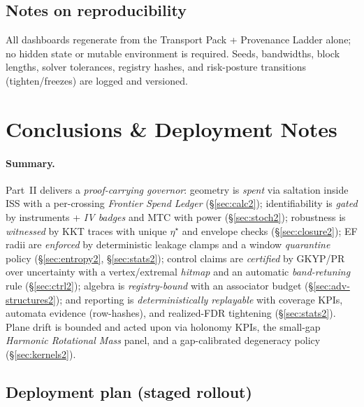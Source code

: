 \documentclass[10pt]{article}
\begin{document}
\subsection*{Notes on reproducibility}
All dashboards regenerate from the Transport Pack + Provenance Ladder alone; no hidden state or mutable environment is required. Seeds, bandwidths, block lengths, solver tolerances, registry hashes, and risk-posture transitions (tighten/freezes) are logged and versioned.

\section{Conclusions \& Deployment Notes}\label{sec:conclusion2}

\paragraph{Summary.}
Part~II delivers a \emph{proof-carrying governor}: geometry is \emph{spent} via saltation inside ISS with a per-crossing \emph{Frontier Spend Ledger} (\S\ref{sec:calc2}); identifiability is \emph{gated} by instruments + \emph{IV badges} and MTC with power (\S\ref{sec:stoch2}); robustness is \emph{witnessed} by KKT traces with unique $\eta^\star$ and envelope checks (\S\ref{sec:closure2}); EF radii are \emph{enforced} by deterministic leakage clamps and a window \emph{quarantine} policy (\S\ref{sec:entropy2}, \S\ref{sec:stats2}); control claims are \emph{certified} by GKYP/PR over uncertainty with a vertex/extremal \emph{hitmap} and an automatic \emph{band-retuning} rule (\S\ref{sec:ctrl2}); algebra is \emph{registry-bound} with an associator budget (\S\ref{sec:adv-structures2}); and reporting is \emph{deterministically replayable} with coverage KPIs, automata evidence (row-hashes), and realized-FDR tightening (\S\ref{sec:stats2}). Plane drift is bounded and acted upon via holonomy KPIs, the small-gap \emph{Harmonic Rotational Mass} panel, and a gap-calibrated degeneracy policy (\S\ref{sec:kernels2}).

\subsection*{Deployment plan (staged rollout)}
\end{document}
